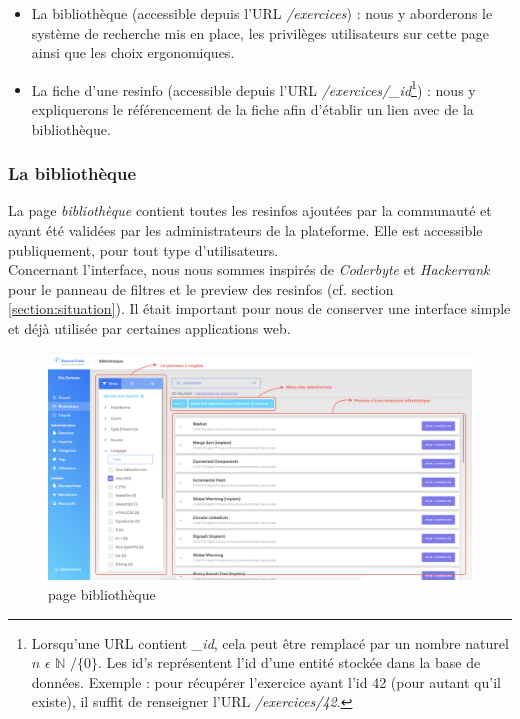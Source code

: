\begin{itemize}
    \item La bibliothèque (accessible depuis l'URL \textit{/exercices}) : nous y aborderons le système de recherche mis en place, les privilèges utilisateurs sur cette page ainsi que les choix ergonomiques.\\
    \item La \gls{fiche} d'une \gls{resinfo} (accessible depuis l'URL \textit{/exercices/\_id}\footnote{
        Lorsqu'une URL contient \textit{\_id}, cela peut être remplacé par un nombre naturel $ n $  $\epsilon$   $\mathbb{N}$ $/ \{0\}$. Les id's représentent l'id d'une entité stockée dans la base de données. Exemple : pour récupérer l'exercice ayant l'id 42 (pour autant qu'il existe), il suffit de renseigner l'URL \textit{/exercices/42}.
    }) : nous y expliquerons le référencement de la \gls{fiche} afin d'établir un lien avec de la bibliothèque.
\end{itemize}

\subsubsection{La bibliothèque}

La page \textit{bibliothèque} contient toutes les \glspl{resinfo} ajoutées par la communauté et ayant été validées par les administrateurs de la plateforme. Elle est accessible publiquement, pour tout type d'utilisateurs.\\

Concernant l'interface, nous nous sommes inspirés de \textit{Coderbyte} et \textit{Hackerrank} pour le panneau de filtres et le preview des \glspl{resinfo} (cf. section \ref{section:situation}). Il était important pour nous de conserver une interface simple et déjà utilisée par certaines applications web.

\begin{figure}[H]
    \includegraphics[width=\textwidth,height=\textheight,keepaspectratio]{images/client/search-library.png}
    \centering
    \caption[SourceCode : page bibliothèque]{page bibliothèque}
    \label{figure:bibliothequeOverview}
\end{figure}

